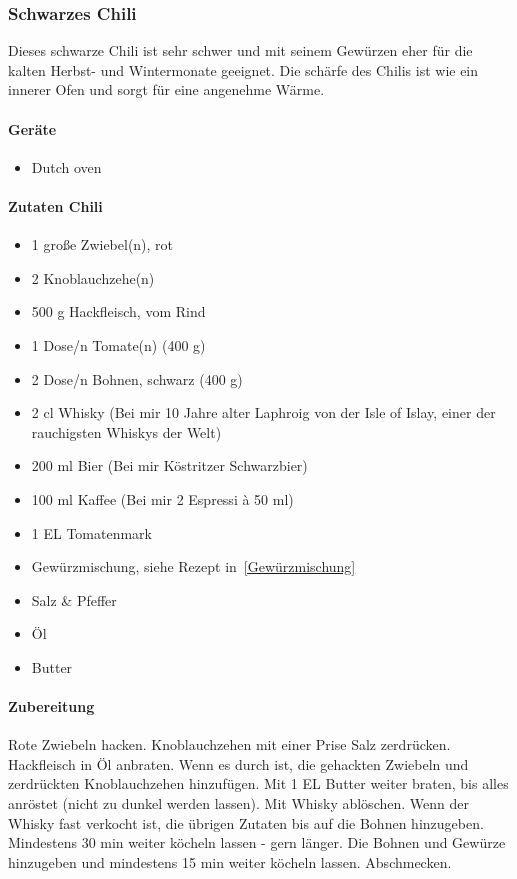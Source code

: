 \subsubsection{Schwarzes Chili}
Dieses schwarze Chili ist sehr schwer und mit seinem Gewürzen eher für die 
kalten Herbst- und Wintermonate geeignet. Die schärfe des Chilis ist wie ein 
innerer Ofen und sorgt für eine angenehme Wärme.

\paragraph{Geräte}

\begin{itemize}[noitemsep]
	\item Dutch oven
\end{itemize}

\paragraph{Zutaten Chili}

\begin{itemize}[noitemsep]
	\item 1 große Zwiebel(n), rot
	\item 2 Knoblauchzehe(n)
	\item 500 g Hackfleisch, vom Rind
	\item 1 Dose/n Tomate(n) (400 g)
	\item 2 Dose/n Bohnen, schwarz (400 g)
	\item 2 cl Whisky (Bei mir 10 Jahre alter Laphroig von der Isle of Islay, einer 
	der rauchigsten Whiskys der Welt)
	\item 200 ml Bier (Bei mir Köstritzer Schwarzbier)
	\item 100 ml Kaffee (Bei mir 2 Espressi à 50 ml)
	\item 1 EL	Tomatenmark
	\item Gewürzmischung, siehe Rezept in~\vref{Gewürzmischung}
	\item Salz \& Pfeffer
	\item Öl
	\item Butter
\end{itemize}

\paragraph{Zubereitung}

Rote Zwiebeln hacken. Knoblauchzehen mit einer Prise Salz zerdrücken. 
Hackfleisch in Öl anbraten. Wenn es durch ist, die gehackten Zwiebeln und 
zerdrückten 
Knoblauchzehen hinzufügen. Mit 1 EL Butter weiter braten, bis alles anröstet 
(nicht zu dunkel werden lassen). Mit Whisky ablöschen. Wenn der Whisky fast 
verkocht 
ist, die übrigen Zutaten bis auf die Bohnen hinzugeben. Mindestens 30 min 
weiter köcheln lassen - gern länger. Die Bohnen und Gewürze hinzugeben und 
mindestens
15 min weiter köcheln lassen. Abschmecken.

